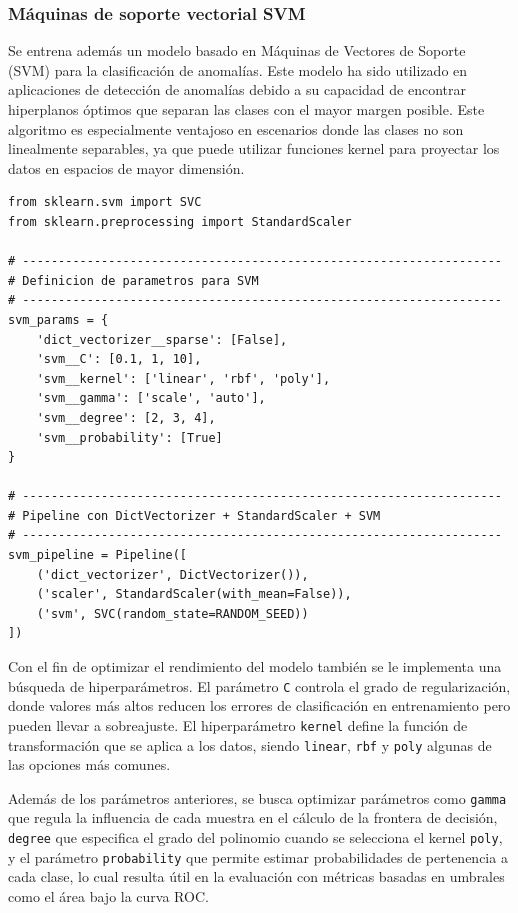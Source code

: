 \documentclass[11pt,a4paper,spanish]{book}
\numberwithin{equation}{chapter}
\numberwithin{figure}{chapter}
\begin{document}
\subsubsection{Máquinas de soporte vectorial SVM}

Se entrena además un modelo basado en Máquinas de Vectores de Soporte (SVM) para la clasificación de anomalías. Este modelo ha sido utilizado en aplicaciones de detección de anomalías debido a su capacidad de encontrar hiperplanos óptimos que separan las clases con el mayor margen posible. Este algoritmo es especialmente ventajoso en escenarios donde las clases no son linealmente separables, ya que puede utilizar funciones kernel para proyectar los datos en espacios de mayor dimensión. 


\vspace{5mm}
\begin{lstlisting}
from sklearn.svm import SVC
from sklearn.preprocessing import StandardScaler

# -------------------------------------------------------------------
# Definicion de parametros para SVM
# -------------------------------------------------------------------
svm_params = {
    'dict_vectorizer__sparse': [False],
    'svm__C': [0.1, 1, 10],                  
    'svm__kernel': ['linear', 'rbf', 'poly'],
    'svm__gamma': ['scale', 'auto'],         
    'svm__degree': [2, 3, 4],                
    'svm__probability': [True]               
}

# -------------------------------------------------------------------
# Pipeline con DictVectorizer + StandardScaler + SVM
# -------------------------------------------------------------------
svm_pipeline = Pipeline([
    ('dict_vectorizer', DictVectorizer()),
    ('scaler', StandardScaler(with_mean=False)),  
    ('svm', SVC(random_state=RANDOM_SEED))
])
\end{lstlisting}

Con el fin de optimizar el rendimiento del modelo también se le implementa una búsqueda de hiperparámetros. El parámetro \lstinline|C| controla el grado de regularización, donde valores más altos reducen los errores de clasificación en entrenamiento pero pueden llevar a sobreajuste. El hiperparámetro \lstinline|kernel| define la función de transformación que se aplica a los datos, siendo \lstinline|linear|, \lstinline|rbf| y \lstinline|poly| algunas de las opciones más comunes. 

Además de los parámetros anteriores, se busca optimizar parámetros como \lstinline|gamma| que regula la influencia de cada muestra en el cálculo de la frontera de decisión, \lstinline|degree| que especifica el grado del polinomio cuando se selecciona el kernel \lstinline|poly|, y el parámetro \lstinline|probability| que permite estimar probabilidades de pertenencia a cada clase, lo cual resulta útil en la evaluación con métricas basadas en umbrales como el área bajo la curva ROC. 
\end{document}
